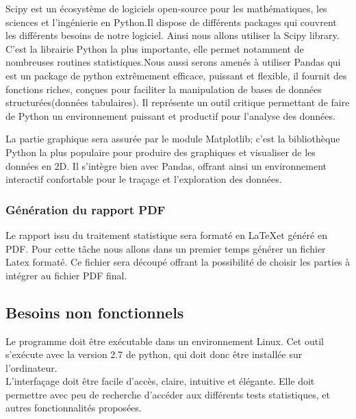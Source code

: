 \documentclass[a4paper]{report}
\begin{document}
Scipy\cite{ref24} est un écosystème de logiciels open-source pour les mathématiques, les sciences et l'ingénierie en Python.Il dispose de différents packages qui couvrent les différents besoins de notre logiciel.
Ainsi nous allons utiliser la Scipy library. C'est la librairie Python la plus importante, elle permet notamment de nombreuses routines statistiques.Nous aussi serons amenés à utiliser Pandas\cite{ref25} qui est un package de python extrêmement efficace, puissant et flexible, il fournit des fonctions riches, conçues pour faciliter la manipulation de bases de données structurées(données tabulaires)\cite{ref26}.
Il représente un outil critique permettant de faire de Python un environnement puissant et productif pour l'analyse des données.

La partie graphique sera assurée par le module Matplotlib\cite{ref27}; c'est la bibliothèque Python la plus populaire pour produire des graphiques et visualiser de les données en 2D. Il s'intègre bien avec Pandas, offrant ainsi un environnement interactif confortable pour le traçage et l'exploration des données.

\subsubsection{Génération du rapport PDF}
Le rapport issu du traitement statistique sera formaté en \LaTeX  et généré en PDF. Pour cette tâche nous allons dans un premier temps générer un fichier Latex formaté. Ce fichier sera découpé offrant la possibilité de choisir les parties à intégrer au fichier PDF final.


\subsection{Besoins non fonctionnels}


Le programme doit être exécutable dans un environnement Linux. Cet outil s'exécute avec la version 2.7 de python, qui doit donc être installée sur l'ordinateur.\\

L'interfaçage doit être facile d'accès, claire, intuitive et élégante. Elle doit permettre avec peu de recherche d'accéder aux différents tests statistiques, et autres fonctionnalités proposées.
\end{document}
